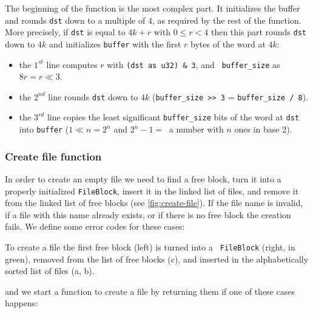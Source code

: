 The beginning of the function is the most complex part. It initializes the
buffer and rounds {\tt dst} down to a multiple of 4, as required by the rest of
the function. More precisely, if {\tt dst} is equal to $4k+r$ with $0\le r<4$
then this part rounds {\tt dst} down to $4k$ and initializes {\tt buffer} with
the first $r$ bytes of the word at $4k$:
\begin{itemize}
  \item the $1^{st}$ line computes $r$ with {\tt (dst as u32) \& 3}, and {\tt
  buffer\_size} as $8r = r \ll 3$.

  \item the $2^{nd}$ line rounds {\tt dst} down to $4k$ ({\tt buffer\_size
  {>}{>} 3} = {\tt buffer\_size / 8}).

  \item the $3^{rd}$ line copies the least significant {\tt buffer\_size} bits
  of the word at {\tt dst} into {\tt buffer} ($1 \ll n = 2^n$ and $2^n - 1 =\ $
  a number with $n$ ones in base 2).
\end{itemize}

\subsubsection{Create file function}

In order to create an empty file we need to find a free block, turn it into a
properly initialized {\tt FileBlock}, insert it in the linked list of files,
and remove it from the linked list of free blocks (see \cref{fig:create-file}).
If the file name is invalid, if a file with this name already exists, or if
there is no free block the creation fails. We define some error codes for these
cases:

\begin{Figure}
  

  \caption{To create a file the first free block (left) is turned into a {\tt
  FileBlock} (right, in green), removed from the list of free blocks (c), and
  inserted in the alphabetically sorted list of files (a,
  b).}\label{fig:create-file}
\end{Figure}


\noindent and we start a function to create a file by returning them if one of
these cases happens:

